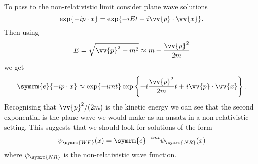 \documentclass[fleqn]{NotesClass}
\newcommand{\e}{\symrm{e}}
\begin{document}
    To pass to the non-relativistic limit consider plane wave solutions
    \begin{equation}
        \exp\{-ip \cdot x\} = \exp\{-iEt + i\vv{p} \cdot \vv{x}\}.
    \end{equation}
    Then using
    \begin{equation}
        E = \sqrt{\vv{p}^2 + m^2} \approx m + \frac{\vv{p}^2}{2m}
    \end{equation}
    we get
    \begin{equation}
        \e\{-ip\cdot x\} \approx \exp\{-imt\}\exp\left\{ -i\frac{\vv{p}^2}{2m}t + i\vv{p} \cdot \vv{x} \right\}.
    \end{equation}
    Recognising that \(\vv{p}^2/(2m)\) is the kinetic energy we can see that the second exponential is the plane wave we would make as an ansatz in a non-relativistic setting.
    This suggests that we should look for solutions of the form
    \begin{equation}
        \psi_{\symrm{WF}}(x) = \e^{-imt} \psi_{\symrm{NR}}(x)
    \end{equation}
    where \(\psi_{\symrm{NR}}\) is the non-relativistic wave function.
    
\end{document}
